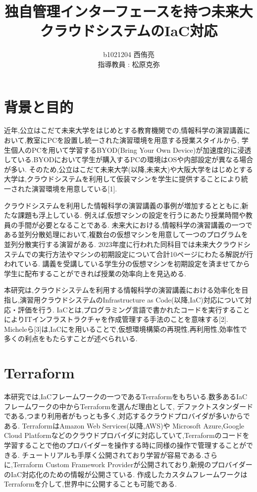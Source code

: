 \documentclass[11pt]{ujarticle}\sloppy
\author{%
b1021204 西侑亮\\指導教員 : 松原克弥
}
\title{独自管理インターフェースを持つ未来大クラウドシステムのIaC対応}
\begin{document}
\maketitle


\section{背景と目的}
\label{sec:intro}
近年,公立はこだて未来大学をはじめとする教育機関での,情報科学の演習講義において,教室にPCを設置し統一された演習環境を用意する授業スタイルから,
学生個人のPCを用いて学習するBYOD(Bring Your Own Device)が加速度的に浸透している.BYODにおいて学生が購入するPCの環境はOSや内部設定が異なる場合が多い.
そのため,公立はこだて未来大学(以降,未来大)や大阪大学をはじめとする大学は,クラウドシステムを利用して仮装マシンを学生に提供することにより統一された演習環境を用意している[1].

クラウドシステムを利用した情報科学の演習講義の事例が増加するとともに,新たな課題も浮上している.
例えば,仮想マシンの設定を行うにあたり授業時間や教員の手間が必要となることである.
未来大における,情報科学の演習講義の一つである並列分散処理において,複数台の仮想マシンを用意して一つのプログラムを並列分散実行する演習がある.
2023年度に行われた同科目では未来大クラウドシステムでの実行方法やマシンの初期設定について合計10ページにわたる解説が行われている.
講義を受講している学生分の仮想マシンを初期設定を済ませてから学生に配布することができれば授業の効率向上を見込める.


本研究は,クラウドシステムを利用する情報科学の演習講義における効率化を目指し,演習用クラウドシステムのInfrastructure as Code(以降,IaC)対応について対応・評価を行う.
IaCとは,プログラミング言語で書かれたコードを実行することによりITインフラストラクチャを作成管理する手法のことを意味する[2].
Micheleら[3]は,IaCにを用いることで,仮想環境構築の再現性,再利用性,効率性で多くの利点をもたらすことが述べられいる.



\section{Terraform}

本研究では,IaCフレームワークの一つであるTerraformをもちいる.数多あるIaCフレームワークの中からTerraformを選んだ理由として,
デファクトスタンダードである,つまり利用者がもっとも多く,対応するクラウドプロバイダが多いからである.
TerraformはAmazon Web Services(以降,AWS)や
Microsoft Azure,Google Cloud Platformなどのクラウドプロバイダに対応していて,Terraformのコードを学習することで他のプロバイダーを操作する時に同様の操作で管理することができる.
チュートリアルも手厚く公開されており学習が容易である.さらに,Terraform Custom Framework Providerが公開されており,新規のプロバイダーのIaC対応化のための情報が公開さている.
作成したカスタムフレームワークはTerraformを介して,世界中に公開することも可能である.
\end{document}
